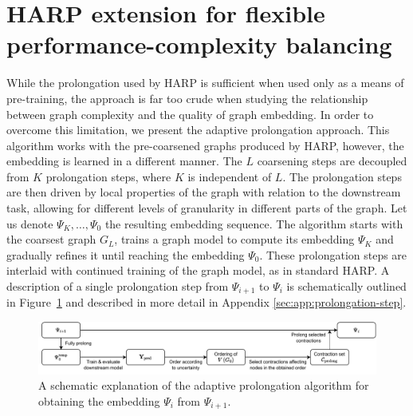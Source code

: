 \section{HARP extension for flexible performance-complexity balancing}\label{sec:our-method}

While the prolongation used by HARP is sufficient when used only as a means of pre-training, the approach is far too crude when studying the relationship between graph complexity and the quality of graph embedding. In order to overcome this limitation, we present the adaptive prolongation approach. This algorithm works with the pre-coarsened graphs produced by HARP, however, the embedding is learned in a different manner. The \( L \) coarsening steps are decoupled from \( K \) prolongation steps, where \( K \) is independent of \( L \). The prolongation steps are then driven by local properties of the graph with relation to the downstream task, allowing for different levels of granularity in different parts of the graph. Let us denote \( \Psi_K, \dots, \Psi_0 \) the resulting embedding sequence. The algorithm starts with the coarsest graph \( G_L \), trains a graph model to compute its embedding \( \Psi_K \) and gradually refines it until reaching the embedding \( \Psi_0 \). These prolongation steps are interlaid with continued training of the graph model, as in standard HARP. A description of a single prolongation step from \( \Psi_{i + 1} \) to \( \Psi_i \) is schematically outlined in Figure~\ref{fig:adaptive-prolongation} and described in more detail in Appendix \ref{sec:app:prolongation-step}.

\begin{figure}
  \centering
  \includegraphics[width=\textwidth]{images/adaptive-prolongation/adaptive-prolongation.pdf}
  \caption{A schematic explanation of the adaptive prolongation algorithm for obtaining the embedding \( \Psi_{i} \) from \( \Psi_{i + 1} \).}
  \label{fig:adaptive-prolongation}
\end{figure}
